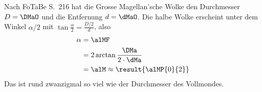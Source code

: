 \begin{center}
\end{center}

Nach FoTaBe S.~216 hat die Grosse Magellan'sche Wolke den Durchmesser $D = \DMaO$ und die Entfernung $d = \dMaO$. Die halbe Wolke erscheint unter dem Winkel $\alpha/2$ mit $\tan\frac{\alpha}{2} = \frac{D/2}{d}$, also
\begin{align}
 \alpha &= \alMF \\
   &= 2\arctan\frac{\DMa}{2\cdot\dMa} \\
   &= \alM \approx \result{\alMP{0}{2}}
\end{align}
Das ist rund zwanzigmal so viel wie der Durchmesser des Vollmondes.

